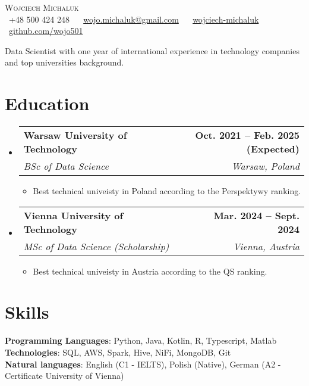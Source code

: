 \documentclass[letterpaper,11pt]{article}
\makeatletter
\newcommand{\resumeItem}[1]{
  \item\small{
    {#1 \vspace{-2pt}}
  }
}
\newcommand{\resumeSubheading}[4]{
  \vspace{-2pt}\item
    \begin{tabular*}{1.0\textwidth}[t]{l@{\extracolsep{\fill}}r}
      \textbf{#1} & \textbf{\small #2} \\
      \textit{\small#3} & \textit{\small #4} \\
    \end{tabular*}\vspace{-7pt}
}
\newcommand{\resumeSubHeadingListStart}{\begin{itemize}[leftmargin=0.0in, label={}]}
\newcommand{\resumeSubHeadingListEnd}{\end{itemize}}
\newcommand{\resumeItemListStart}{\begin{itemize}}
\newcommand{\resumeItemListEnd}{\end{itemize}\vspace{-5pt}}
\makeatother
\begin{document}

\begin{center}
  {\Huge \scshape Wojciech Michaluk} \\[5pt] %
  \small
  \faPhone\ +48 500 424 248 ~ 
  \faEnvelope\ \href{mailto:wojo.michaluk@gmail.com}{wojo.michaluk@gmail.com} ~
  \faLinkedin\ \href{https://www.linkedin.com/in/wojciech-michaluk-a09465269/}{wojciech-michaluk} ~
  \faGithub\ \href{https://github.com/wojo501}{github.com/wojo501} \\[3pt]
\end{center}

Data Scientist with one year of international experience in technology companies and top universities background.

\section{Education}
\resumeSubHeadingListStart

\resumeSubheading
{Warsaw University of Technology}{Oct. 2021 -- Feb. 2025 (Expected)}
{BSc of Data Science}{Warsaw, Poland}
\resumeItemListStart
\resumeItem{Best technical univeisty in Poland according to the Perspektywy ranking.}
\resumeItemListEnd

\resumeSubheading
{Vienna University of Technology}{Mar. 2024 -- Sept. 2024}
{MSc of Data Science (Scholarship)}{Vienna, Austria}
\resumeItemListStart
\resumeItem{Best technical univeisty in Austria according to the QS ranking.}
\resumeItemListEnd

\resumeSubHeadingListEnd
\vspace{-16pt}

\section{Skills}
\begin{itemize}[leftmargin=0.15in, label={}]
  \small{\item{
                \textbf{Programming Languages}{: Python, Java, Kotlin, R, Typescript, Matlab} \\
                \textbf{Technologies}{: SQL, AWS, Spark, Hive, NiFi, MongoDB, Git} \\
                \textbf{Natural languages}{: English (C1 - IELTS), Polish (Native), German (A2 - Certificate University of Vienna)} \\
          }}
\end{itemize}
\vspace{-16pt}
\end{document}
